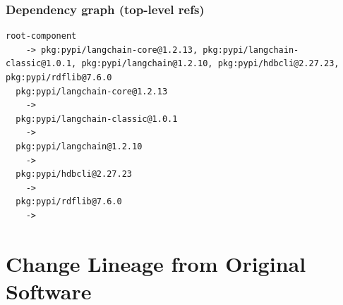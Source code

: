 \documentclass[11pt,a4paper]{article}
\begin{document}
\subsubsection*{Dependency graph (top-level refs)}
\begin{lstlisting}[style=depgraph]
  root-component
    -> pkg:pypi/langchain-core@1.2.13, pkg:pypi/langchain-classic@1.0.1, pkg:pypi/langchain@1.2.10, pkg:pypi/hdbcli@2.27.23, pkg:pypi/rdflib@7.6.0
  pkg:pypi/langchain-core@1.2.13
    -> 
  pkg:pypi/langchain-classic@1.0.1
    -> 
  pkg:pypi/langchain@1.2.10
    -> 
  pkg:pypi/hdbcli@2.27.23
    -> 
  pkg:pypi/rdflib@7.6.0
    -> 
\end{lstlisting}

\newpage
\section{Change Lineage from Original Software}
\end{document}
